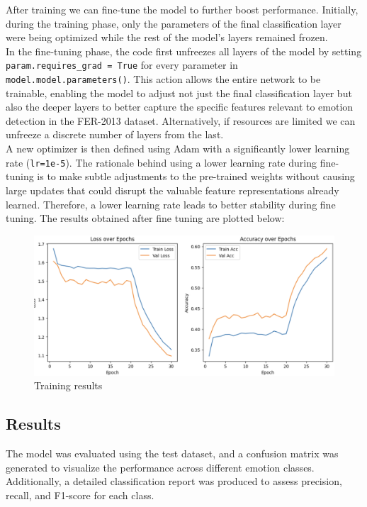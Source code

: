\documentclass{article}
\begin{document}
After training we can fine-tune the model to further boost performance. 
Initially, during the training phase, only the parameters of the final classification layer were being optimized while the rest of the model's layers remained frozen.
\\
In the fine-tuning phase, the code first unfreezes all layers of the model by setting \texttt{param.requires\_grad = True} for every parameter in \texttt{model.model.parameters()}.
This action allows the entire network to be trainable, enabling the model to adjust not just the final classification layer but also the deeper layers to better capture the specific features relevant to emotion detection in the FER-2013 dataset.
Alternatively, if resources are limited we can unfreeze a discrete number of layers from the last.
\\
A new optimizer is then defined using Adam with a significantly lower learning rate (\texttt{lr=1e-5}). 
The rationale behind using a lower learning rate during fine-tuning is to make subtle adjustments to the pre-trained weights without causing large updates that could disrupt the valuable feature representations already learned. 
Therefore, a lower learning rate leads to better stability during fine tuning.
The results obtained after fine tuning are plotted below:
\begin{figure}[htbp]
    \centering
    \includegraphics[width=\textwidth]{fine_tuning.png}
    \caption{Training results}
    \label{fig:fine_tuning}
\end{figure}

\subsection*{Results}

The model was evaluated using the test dataset, and a confusion matrix was generated to visualize the performance across different emotion classes. Additionally, a detailed classification report was produced to assess precision, recall, and F1-score for each class.
\end{document}
